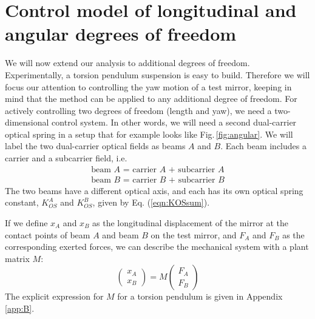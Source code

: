 
\section{Control model of longitudinal and angular degrees of freedom}
\label{sec:III} 

We will now extend our analysis to additional degrees of freedom. Experimentally, a torsion pendulum suspension is  easy to build. Therefore we will focus our attention to controlling the yaw motion of a test mirror, keeping in mind that the method can be applied to any additional degree of freedom. For actively controlling two degrees of freedom (length and yaw), we need a two-dimensional control system. In other words, we will need a second dual-carrier optical spring in a setup that for example looks like Fig.\,\ref{fig:angular}. We will label the two dual-carrier optical fields as beams $A$ and $B$. Each beam includes a carrier and a subcarrier field, i.e.
\begin{align}
\label{eqn:beams}
\mbox{beam $A$ = carrier $A$ + subcarrier $A$}\\ \nonumber
\mbox{beam $B$ = carrier $B$ + subcarrier $B$}\nonumber
\end{align}
The two beams have a different optical axis, and each has its own optical spring constant, $K_{OS}^A$ and $K_{OS}^B$, given by Eq. (\ref{eqn:KOSsum}).

If we define $x_A$ and $x_B$ as the longitudinal displacement of the mirror at the contact points
of beam $A$ and beam $B$ on the test mirror,
 and $F_A$ and $F_B$ as the corresponding exerted forces, we can describe the mechanical system with a plant matrix $M$:
\begin{equation}
 \begin{pmatrix}
x_A\\ x_B
\end{pmatrix} 
=
M \begin{pmatrix}
F_{A}\\ F_{B}
\end{pmatrix}
\label{eq:MF}
\end{equation}
The explicit expression for $M$ for a torsion pendulum is given in Appendix \ref{app:B}.

